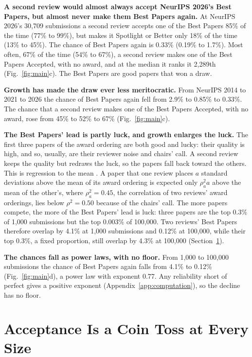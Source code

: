 \documentclass{article}
\begin{document}
\textbf{A second review would almost always accept NeurIPS 2026's Best Papers, but almost never make them Best Papers again.} At NeurIPS 2026's 30,709 submissions a second review accepts one of the Best Papers 85\% of the time (77\% to 99\%), but makes it Spotlight or Better only 18\% of the time (13\% to 45\%). The chance of Best Papers again is 0.33\% (0.19\% to 1.7\%). Most often, 67\% of the time (54\% to 67\%), a second review makes one of the Best Papers Accepted, with no award, and at the median it ranks it 2,289th (Fig.~\ref{fig:main}c). The Best Papers are good papers that won a draw.

\textbf{Growth has made the draw ever less meritocratic.} From NeurIPS 2014 to 2021 to 2026 the chance of Best Papers again fell from 2.9\% to 0.85\% to 0.33\%. The chance that a second review makes one of the Best Papers Accepted, with no award, rose from 45\% to 52\% to 67\% (Fig.~\ref{fig:main}c).

\textbf{The Best Papers' lead is partly luck, and growth enlarges the luck.} The first three papers of the award ordering are both good and lucky: their quality is high, and so, usually, are their reviewer noise and chairs' call. A second review keeps the quality but redraws the luck, so the papers fall back toward the others. This is regression to the mean \citep{smith2006optimizer,denrell2012top}. A paper that one review places $a$ standard deviations above the mean of its award ordering is expected only $\rho_a^2 a$ above the mean of the other's, where $\rho_a^2=0.45$, the correlation of two reviews' award orderings, lies below $\rho^2=0.50$ because of the chairs' call. The more papers compete, the more of the Best Papers' lead is luck: three papers are the top 0.3\% of 1,000 submissions but the top 0.003\% of 100,000. Two reviews' Best Papers therefore overlap by 4.1\% at 1,000 submissions and 0.12\% at 100,000, while their top 0.3\%, a fixed proportion, still overlap by 4.3\% at 100,000 (Section~\ref{sec:accept}).

\textbf{The chances fall as power laws, with no floor.} From 1,000 to 100,000 submissions the chance of Best Papers again falls from 4.1\% to 0.12\% (Fig.~\ref{fig:main}d), a power law with exponent 0.77. Any reliability short of perfect gives a positive exponent (Appendix~\ref{app:computation}), so the decline has no floor.

\section{Acceptance Is a Coin Toss at Every Size}\label{sec:accept}
\end{document}
